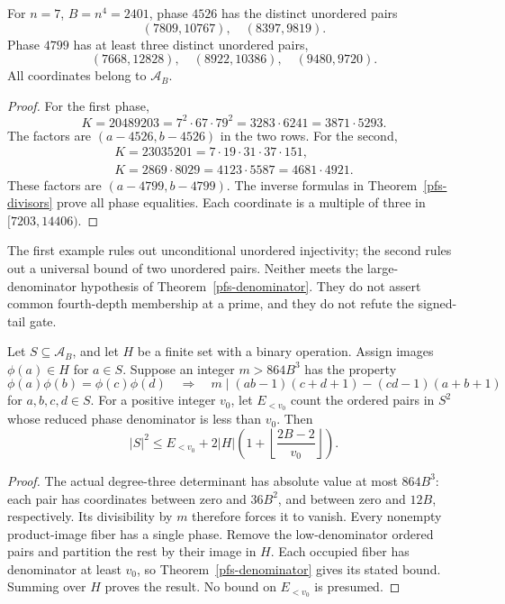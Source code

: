\begin{proposition}
\label{pfs-examples}
For $n=7$, $B=n^4=2401$, phase $4526$ has the distinct unordered
pairs
\[
 (7809,10767),\quad(8397,9819).
\]
Phase $4799$ has at least three distinct unordered pairs,
\[
 (7668,12828),\quad(8922,10386),\quad(9480,9720).
\]
All coordinates belong to $\mathcal A_B$.
\end{proposition}
\begin{proof}
For the first phase,
\[
 K=20489203=7^2\cdot67\cdot79^2
   =3283\cdot6241=3871\cdot5293.
\]
The factors are $(a-4526,b-4526)$ in the two rows. For the second,
\begin{gather*}
 K=23035201=7\cdot19\cdot31\cdot37\cdot151,\\
 K=2869\cdot8029=4123\cdot5587=4681\cdot4921.
\end{gather*}
These factors are $(a-4799,b-4799)$. The inverse formulas in
Theorem~\ref{pfs-divisors} prove all phase equalities. Each
coordinate is a multiple of three in $[7203,14406)$.
\end{proof}

The first example rules out unconditional unordered injectivity;
the second rules out a universal bound of two unordered pairs.
Neither meets the large-denominator hypothesis of
Theorem~\ref{pfs-denominator}. They do not assert common
fourth-depth membership at a prime, and they do not refute the
signed-tail gate.

\begin{theorem}\label{pfs-marks}
Let $S\subseteq\mathcal A_B$, and let $H$ be a finite set with
a binary operation. Assign images $\phi(a)\in H$ for $a\in S$.
Suppose an integer $m>864B^3$ has the property
\begin{equation}\label{pfs-div-input}
 \phi(a)\phi(b)=\phi(c)\phi(d)
 \quad\Longrightarrow\quad
 m\mid(ab-1)(c+d+1)-(cd-1)(a+b+1)
\end{equation}
for $a,b,c,d\in S$. For a positive integer $v_0$, let $E_{<v_0}$
count the ordered pairs in $S^2$ whose reduced phase denominator
is less than $v_0$. Then
\begin{equation}\label{pfs-low-denominator-remainder}
 |S|^2\leq E_{<v_0}
  +2|H|\left(1+\left\lfloor\frac{2B-2}{v_0}\right\rfloor\right).
\end{equation}
\end{theorem}
\begin{proof}
The actual degree-three determinant has absolute value at most
$864B^3$: each pair has coordinates between zero and $36B^2$,
and between zero and $12B$, respectively. Its divisibility by
$m$ therefore forces it to vanish. Every nonempty product-image
fiber has a single phase. Remove the low-denominator ordered pairs
and partition the rest by their image in $H$. Each occupied fiber
has denominator at least $v_0$, so Theorem~\ref{pfs-denominator}
gives its stated bound. Summing over $H$ proves the result.
No bound on $E_{<v_0}$ is presumed.
\end{proof}

